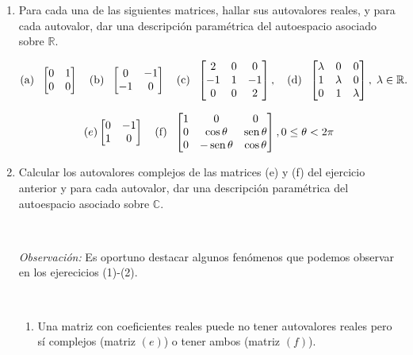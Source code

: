 \documentclass[12pt]{amsart}
\begin{document}
\begin{enumerate} 


\item Para cada una de las siguientes matrices, hallar sus autovalores reales, y para cada autovalor, dar una descripci\' on param\'etrica del autoespacio asociado sobre $\mathbb{R}$. 


$$\textrm{(a)\; } \left[\begin{matrix}0 & 1\\ 0 & 0 \end{matrix} \right]
\quad 
\textrm{(b)\; } 
\left[\begin{matrix}0 & -1\\ -1 & 0 \end{matrix} \right]
\quad \textrm{(c)\; } \left[\begin{matrix}2 & 0 & 0\\ -1 & 1& -1\\ 0 & 0 & 2 \end{matrix} \right] , 
\quad 
\textrm{(d)\; } \begin{bmatrix} \lambda & 0 & 0 \\ 1 & \lambda & 0\\ 0 & 1 & \lambda \\ \end{bmatrix}, \; \lambda\in \mathbb R.$$


$$(e)\begin{bmatrix} 0 & -1 \\ 1 & 0 \end{bmatrix}
\quad
\textrm{(f)\; } \left[\begin{matrix}1 & 0& 0 \\ 0 & \cos\theta & \operatorname{sen}\theta\\ 0 & -\operatorname{sen}\theta & \cos\theta \end{matrix} \right], 0\leq \theta<2\pi
$$

\item Calcular los autovalores complejos de las matrices (e) y (f) del ejercicio anterior y para cada autovalor, dar una descripci\' on param\'etrica del autoespacio asociado sobre $\mathbb{C}$. 

\

\item[{\it Observaci\'on:}] Es oportuno destacar algunos fen\'omenos que podemos observar en los ejerecicios (1)-(2).

\

\begin{enumerate}
 \item Una matriz con coeficientes reales puede no tener autovalores reales pero s\'i complejos (matriz $(e)$) o tener ambos (matriz $(f)$).
 

\end{enumerate}
\end{enumerate}
\end{document}
